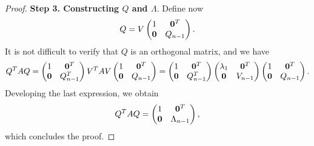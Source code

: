 \begin{proof}
            \vspace{.3cm}
            \textbf{Step 3. Constructing $Q$ and $\Lambda$}.
            Define now
            \[
                Q =
                V
                \begin{pmatrix}
                    1 & \mathbf 0^T \\
                    \mathbf 0 & Q_{n-1}
                \end{pmatrix}.
            \]
            It is not difficult to verify that $Q$ is an orthogonal matrix,
            and we have
            \[
                Q^T A Q =
                \begin{pmatrix}
                    1 & \mathbf 0^T \\
                    \mathbf 0 & Q_{n-1}^T
                \end{pmatrix}
                V^T A V
                \begin{pmatrix}
                    1 & \mathbf 0^T \\
                    \mathbf 0 & Q_{n-1}
                \end{pmatrix}
                =
                \begin{pmatrix}
                    1 & \mathbf 0^T \\
                    \mathbf 0 & Q_{n-1}^T
                \end{pmatrix}
                \begin{pmatrix}
                    \lambda_1 & \mathbf 0^T \\
                    \mathbf 0 & V_{n-1}
                \end{pmatrix}
                \begin{pmatrix}
                    1 & \mathbf 0^T \\
                    \mathbf 0 & Q_{n-1}
                \end{pmatrix}.
            \]
            Developing the last expression, we obtain
            \[
                Q^T A Q
                =
                \begin{pmatrix}
                    1 & \mathbf 0^T \\
                    \mathbf 0 & \Lambda_{n-1}
                \end{pmatrix},
            \]
            which concludes the proof.
\end{proof}
